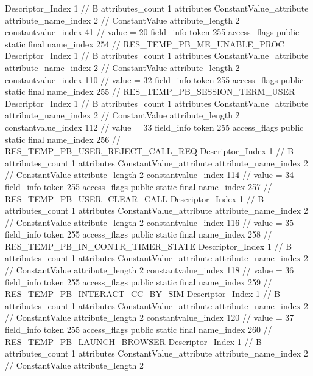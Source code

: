 {{{{{				Descriptor_Index	1		// B
				attributes_count	1
				attributes {
				ConstantValue_attribute {
					attribute_name_index	2		// ConstantValue
					attribute_length	2
					constantvalue_index	41		// value = 20
				}
				}
			}
			field_info {
				token	255
				access_flags	public static final
				name_index	254		// RES_TEMP_PB_ME_UNABLE_PROC
				Descriptor_Index	1		// B
				attributes_count	1
				attributes {
				ConstantValue_attribute {
					attribute_name_index	2		// ConstantValue
					attribute_length	2
					constantvalue_index	110		// value = 32
				}
				}
			}
			field_info {
				token	255
				access_flags	public static final
				name_index	255		// RES_TEMP_PB_SESSION_TERM_USER
				Descriptor_Index	1		// B
				attributes_count	1
				attributes {
				ConstantValue_attribute {
					attribute_name_index	2		// ConstantValue
					attribute_length	2
					constantvalue_index	112		// value = 33
				}
				}
			}
			field_info {
				token	255
				access_flags	public static final
				name_index	256		// RES_TEMP_PB_USER_REJECT_CALL_REQ
				Descriptor_Index	1		// B
				attributes_count	1
				attributes {
				ConstantValue_attribute {
					attribute_name_index	2		// ConstantValue
					attribute_length	2
					constantvalue_index	114		// value = 34
				}
				}
			}
			field_info {
				token	255
				access_flags	public static final
				name_index	257		// RES_TEMP_PB_USER_CLEAR_CALL
				Descriptor_Index	1		// B
				attributes_count	1
				attributes {
				ConstantValue_attribute {
					attribute_name_index	2		// ConstantValue
					attribute_length	2
					constantvalue_index	116		// value = 35
				}
				}
			}
			field_info {
				token	255
				access_flags	public static final
				name_index	258		// RES_TEMP_PB_IN_CONTR_TIMER_STATE
				Descriptor_Index	1		// B
				attributes_count	1
				attributes {
				ConstantValue_attribute {
					attribute_name_index	2		// ConstantValue
					attribute_length	2
					constantvalue_index	118		// value = 36
				}
				}
			}
			field_info {
				token	255
				access_flags	public static final
				name_index	259		// RES_TEMP_PB_INTERACT_CC_BY_SIM
				Descriptor_Index	1		// B
				attributes_count	1
				attributes {
				ConstantValue_attribute {
					attribute_name_index	2		// ConstantValue
					attribute_length	2
					constantvalue_index	120		// value = 37
				}
				}
			}
			field_info {
				token	255
				access_flags	public static final
				name_index	260		// RES_TEMP_PB_LAUNCH_BROWSER
				Descriptor_Index	1		// B
				attributes_count	1
				attributes {
				ConstantValue_attribute {
					attribute_name_index	2		// ConstantValue
					attribute_length	2
}}}}}}}
